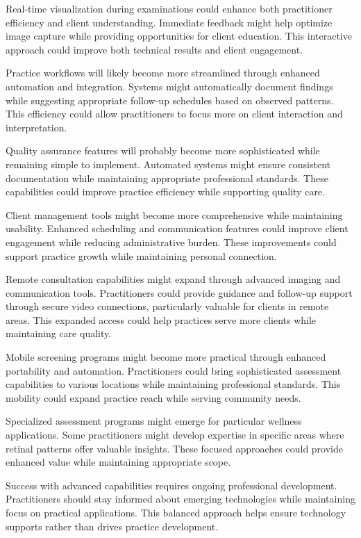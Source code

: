 \documentclass[
  Letterpaper,
]{scrbook}
\begin{document}
Real-time visualization during examinations could enhance both
practitioner efficiency and client understanding. Immediate feedback
might help optimize image capture while providing opportunities for
client education. This interactive approach could improve both technical
results and client engagement.

Practice workflows will likely become more streamlined through enhanced
automation and integration. Systems might automatically document
findings while suggesting appropriate follow-up schedules based on
observed patterns. This efficiency could allow practitioners to focus
more on client interaction and interpretation.

Quality assurance features will probably become more sophisticated while
remaining simple to implement. Automated systems might ensure consistent
documentation while maintaining appropriate professional standards.
These capabilities could improve practice efficiency while supporting
quality care.

Client management tools might become more comprehensive while
maintaining usability. Enhanced scheduling and communication features
could improve client engagement while reducing administrative burden.
These improvements could support practice growth while maintaining
personal connection.

Remote consultation capabilities might expand through advanced imaging
and communication tools. Practitioners could provide guidance and
follow-up support through secure video connections, particularly
valuable for clients in remote areas. This expanded access could help
practices serve more clients while maintaining care quality.

Mobile screening programs might become more practical through enhanced
portability and automation. Practitioners could bring sophisticated
assessment capabilities to various locations while maintaining
professional standards. This mobility could expand practice reach while
serving community needs.

Specialized assessment programs might emerge for particular wellness
applications. Some practitioners might develop expertise in specific
areas where retinal patterns offer valuable insights. These focused
approaches could provide enhanced value while maintaining appropriate
scope.

Success with advanced capabilities requires ongoing professional
development. Practitioners should stay informed about emerging
technologies while maintaining focus on practical applications. This
balanced approach helps ensure technology supports rather than drives
practice development.
\end{document}
